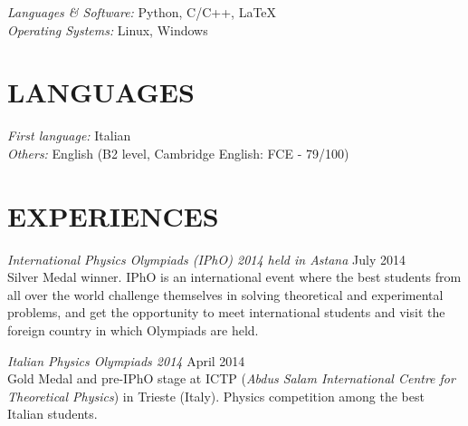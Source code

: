 \documentclass[margin, 10pt]{res} %
\begin{document}
\begin{resume}

{\sl Languages \& Software:} 
Python, C/C++, \LaTeX \\
{\sl Operating Systems:} Linux, Windows


\section{LANGUAGES} 

{\sl First language:} Italian\\
{\sl Others:} English (B2 level, Cambridge English: FCE - 79/100)


 
\section{EXPERIENCES}



{\sl International Physics Olympiads (IPhO) 2014 held in Astana} \hfill July 2014\\
Silver Medal winner. IPhO is an international event where the best students from all over the world challenge themselves in solving theoretical and experimental problems, and get the opportunity to meet international students and visit the foreign country in which Olympiads are held.

{\sl Italian Physics Olympiads 2014} \hfill April 2014\\
Gold Medal and pre-IPhO stage at ICTP (\textit{Abdus Salam International Centre for Theoretical Physics}) in Trieste (Italy). Physics competition among the best Italian students. 


\end{resume}
\end{document}

